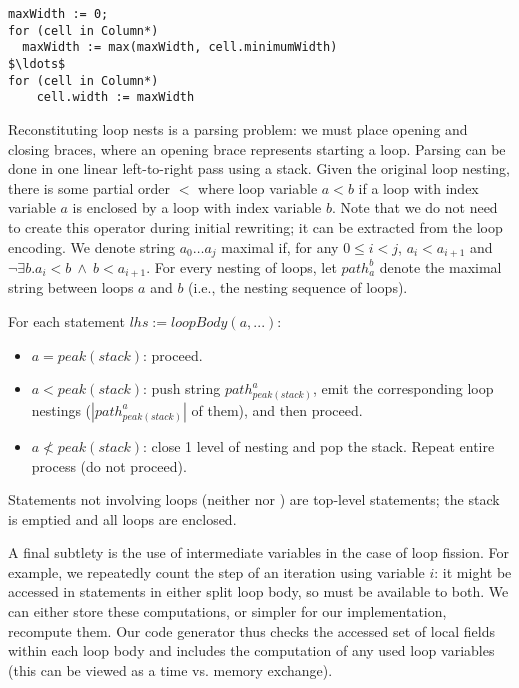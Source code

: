 \begin{lstlisting}[mathescape]
maxWidth := 0;
for (cell in Column*) 
  maxWidth := max(maxWidth, cell.minimumWidth)
$\ldots$  
for (cell in Column*)
    cell.width := maxWidth
\end{lstlisting}


Reconstituting loop nests is a parsing problem: we must place opening and closing braces, where an opening brace represents starting a loop. Parsing can be done in one linear left-to-right pass using a stack. Given the original loop nesting, there is some partial order $<$ where loop variable $a < b$ if a loop with index variable $a$ is enclosed by a loop with index variable $b$. Note that we do not need to create this operator during initial rewriting; it can be extracted from the loop encoding. We denote string $a_0 \ldots a_j$ maximal if, for any $0 \leq i < j$, $a_i < a_{i+1}$ and $\neg \exists b . a_i < b ~\wedge~ b < a_{i+1}$. For every nesting of loops, let $path_{a}^{b}$ denote the maximal string between loops $a$ and $b$ (i.e., the nesting sequence of loops).

For each statement $lhs := loopBody(a, ...)$:

\begin{itemize}
\item $a = peak(stack)$: proceed.
\item $a < peak(stack)$: push string $path_{peak(stack)}^{a}$, emit the corresponding loop nestings ($|path_{peak(stack)}^{a}|$ of them), and then proceed.
\item $a \not< peak(stack)$: close 1 level of nesting and pop the stack. Repeat entire process (do not proceed).
\end{itemize}

Statements not involving loops (neither  nor ) are top-level statements; the stack is emptied and all loops are enclosed.

A final subtlety is the use of intermediate variables in the case of loop fission. For example, we repeatedly count the step of an iteration using variable $i$: it might be accessed in statements in either split loop body, so must be available to both. We can either store these computations, or simpler for our implementation, recompute them. Our code generator thus checks the accessed set of local fields within each loop body and includes the computation of any used loop variables (this can be viewed as a time vs. memory exchange).



